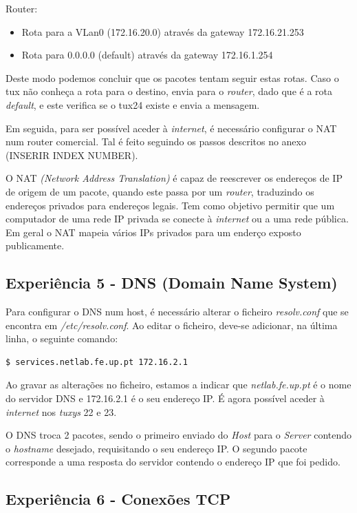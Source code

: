 \documentclass[11pt]{article}
\begin{document}
Router:
\begin{itemize}
\item Rota para a VLan0 (172.16.20.0) através da gateway 172.16.21.253
\item Rota para 0.0.0.0 (default) através da gateway 172.16.1.254
\end{itemize}

Deste modo podemos concluir que os pacotes tentam seguir estas rotas. Caso o tux não conheça a rota para o destino, envia para o \textit{router}, dado que é a rota \textit{default}, e este verifica se o tux24 existe e envia a mensagem. 

Em seguida, para ser possível aceder à \textit{internet}, é necessário configurar o NAT num router comercial. Tal é feito seguindo os passos descritos no anexo (INSERIR INDEX NUMBER).

O NAT \emph{(Network Address Translation)} é capaz de reescrever os endereços de IP de origem de um pacote, quando este passa por um \textit{router}, traduzindo os endereços privados para endereços legais. Tem como objetivo permitir que um computador de uma rede IP privada se conecte à \textit{internet} ou a uma rede pública. Em geral o NAT mapeia vários IPs privados para um enderço exposto publicamente.

\subsection{Experiência 5 - DNS (Domain Name System)}

Para configurar o DNS num host, é necessário alterar o ficheiro \textit{resolv.conf} que se encontra em \textit{/etc/resolv.conf}. Ao editar o ficheiro, deve-se adicionar, na última linha, o seguinte comando:

\begin{lstlisting}[language=bash]
    $ services.netlab.fe.up.pt 172.16.2.1
\end{lstlisting}

Ao gravar as alterações no ficheiro, estamos a indicar que \textit{netlab.fe.up.pt} é o nome do servidor DNS e 172.16.2.1 é o seu endereço IP. É agora possível aceder à \textit{internet} nos \textit{tuxys} 22 e 23.

O DNS troca 2 pacotes, sendo o primeiro enviado do \textit{Host} para o \textit{Server} contendo o \textit{hostname} desejado, requisitando o seu endereço IP. O segundo pacote corresponde a uma resposta do servidor contendo o endereço IP que foi pedido.

\subsection{Experiência 6 - Conexões TCP}
\end{document}
